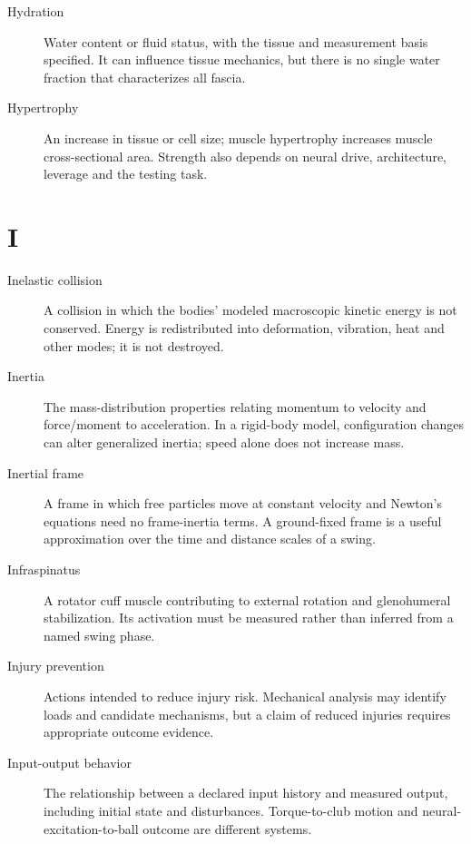 \begin{description}
\item[Hydration] Water content or fluid status, with the tissue and measurement basis specified. It can influence tissue mechanics, but there is no single water fraction that characterizes all fascia.

\item[Hypertrophy] An increase in tissue or cell size; muscle hypertrophy increases muscle cross-sectional area. Strength also depends on neural drive, architecture, leverage and the testing task.

\end{description}
\section*{I}
\begin{description}

\item[Inelastic collision] A collision in which the bodies' modeled macroscopic kinetic energy is not conserved. Energy is redistributed into deformation, vibration, heat and other modes; it is not destroyed.

\item[Inertia] The mass-distribution properties relating momentum to velocity and force/moment to acceleration. In a rigid-body model, configuration changes can alter generalized inertia; speed alone does not increase mass.

\item[Inertial frame] A frame in which free particles move at constant velocity and Newton's equations need no frame-inertia terms. A ground-fixed frame is a useful approximation over the time and distance scales of a swing.

\item[Infraspinatus] A rotator cuff muscle contributing to external rotation and glenohumeral stabilization. Its activation must be measured rather than inferred from a named swing phase.

\item[Injury prevention] Actions intended to reduce injury risk. Mechanical analysis may identify loads and candidate mechanisms, but a claim of reduced injuries requires appropriate outcome evidence.

\item[Input-output behavior] The relationship between a declared input history and measured output, including initial state and disturbances. Torque-to-club motion and neural-excitation-to-ball outcome are different systems.


\end{description}

